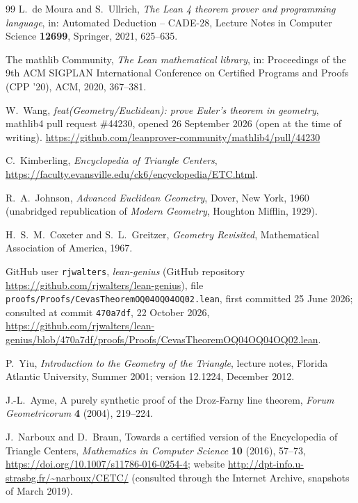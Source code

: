 \documentclass[11pt]{article}
\theoremstyle{definition}
\theoremstyle{remark}
\begin{document}
\begin{thebibliography}{99}
L.~de Moura and S.~Ullrich,
\emph{The Lean 4 theorem prover and programming language},
in: Automated Deduction -- CADE-28, Lecture Notes in Computer Science \textbf{12699}, Springer, 2021, 625--635.

The mathlib Community,
\emph{The Lean mathematical library},
in: Proceedings of the 9th ACM SIGPLAN International Conference on Certified Programs and Proofs (CPP '20), ACM, 2020, 367--381.

W.~Wang, \emph{feat(Geometry/Euclidean): prove Euler's theorem in geometry}, mathlib4 pull request \#44230, opened 26 September 2026 (open at the time of writing).
\url{https://github.com/leanprover-community/mathlib4/pull/44230}

C.~Kimberling,
\emph{Encyclopedia of Triangle Centers},
\url{https://faculty.evansville.edu/ck6/encyclopedia/ETC.html}.

R.~A.~Johnson,
\emph{Advanced Euclidean Geometry},
Dover, New York, 1960 (unabridged republication of \emph{Modern Geometry}, Houghton Mifflin, 1929).

H.~S.~M.~Coxeter and S.~L.~Greitzer,
\emph{Geometry Revisited},
Mathematical Association of America, 1967.

GitHub user \texttt{rjwalters}, \emph{lean-genius} (GitHub repository \url{https://github.com/rjwalters/lean-genius}),
file \texttt{proofs/Proofs/CevasTheoremOQ04OQ04OQ02.lean}, first committed 25 June 2026; consulted at
commit \texttt{470a7df}, 22 October 2026,
\url{https://github.com/rjwalters/lean-genius/blob/470a7df/proofs/Proofs/CevasTheoremOQ04OQ04OQ02.lean}.

P.~Yiu, \emph{Introduction to the Geometry of the Triangle}, lecture notes, Florida Atlantic
University, Summer 2001; version 12.1224, December 2012.

J.-L.~Ayme, A purely synthetic proof of the Droz-Farny line theorem, \emph{Forum Geometricorum}
\textbf{4} (2004), 219--224.

J.~Narboux and D.~Braun, Towards a certified version of the Encyclopedia of Triangle Centers,
\emph{Mathematics in Computer Science} \textbf{10} (2016), 57--73,
\url{https://doi.org/10.1007/s11786-016-0254-4}; website
\url{http://dpt-info.u-strasbg.fr/~narboux/CETC/} (consulted through the Internet Archive, snapshots of
March 2019).


\end{thebibliography}
\end{document}
